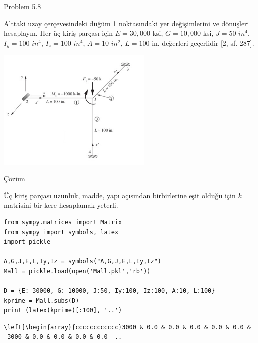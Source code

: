 \documentclass[12pt,fleqn]{article}\usepackage{../../common}
\begin{document}
Problem 5.8

Alttaki uzay çerçevesindeki düğüm 1 noktasındaki yer değişimlerini ve dönüşleri
hesaplayın. Her üç kiriş parçası için $E=30,000$ ksi, $G=10,000$ ksi, $J = 50$
$in^4$, $I_y=100$ $in^4$, $I_z = 100$ $in^4$, $A=10$ $in^2$, $L = 100$ in.
değerleri geçerlidir [2, sf. 287].

\includegraphics[width=20em]{phy_020_strs_11_06.jpg}

Çözüm

Üç kiriş parçası uzunluk, madde, yapı açısından birbirlerine eşit olduğu için
$k$ matrisini bir kere hesaplamak yeterli. 

\begin{verbatim}
from sympy.matrices import Matrix
from sympy import symbols, latex
import pickle

A,G,J,E,L,Iy,Iz = symbols("A,G,J,E,L,Iy,Iz")
Mall = pickle.load(open('Mall.pkl','rb'))

D = {E: 30000, G: 10000, J:50, Iy:100, Iz:100, A:10, L:100}
kprime = Mall.subs(D)
print (latex(kprime)[:100], '..')
\end{verbatim}

\begin{verbatim}
\left[\begin{array}{cccccccccccc}3000 & 0.0 & 0.0 & 0.0 & 0.0 & 0.0 & -3000 & 0.0 & 0.0 & 0.0 & 0.0  ..
\end{verbatim}
\end{document}
